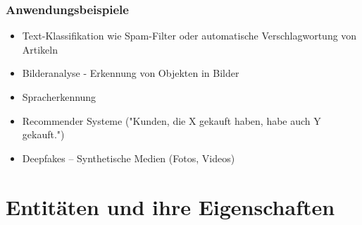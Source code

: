 \documentclass[aspectratio=169]{beamer}
\begin{document}
\begin{frame}

  \begin{center}
    \begin{adjustbox}{max totalsize={.9\textwidth}{.7\textheight},center}
    \end{adjustbox}
  \end{center}
\end{frame}



\begin{frame}
  \frametitle{Anwendungsbeispiele}
  \begin{block}{}
    \begin{center}
      \begin{itemize}
      \item Text-Klassifikation wie Spam-Filter oder automatische
        Verschlagwortung von Artikeln
      \item Bilderanalyse - Erkennung von Objekten in Bilder
      \item Spracherkennung
      \item Recommender Systeme ("Kunden, die X gekauft haben, habe
        auch Y gekauft.")
      \item Deepfakes -- Synthetische Medien (Fotos, Videos)
      \end{itemize}
    \end{center}
  \end{block}
\end{frame}

\section{Entitäten und ihre Eigenschaften}

\begin{frame}{}
   \tableofcontents[currentsection]
\end{frame}
\end{document}
